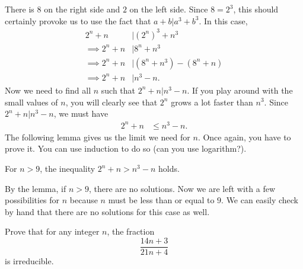 \documentclass{subfile}
\begin{document}
		\begin{solution}
			There is $8$ on the right side and $2$ on the left side. Since $8=2^3$, this should certainly provoke us to use the fact that $a+b|a^3+b^3$. In this case,
				\begin{align*}
					2^n+n   & |(2^n)^3+n^3 \\
					\implies  2^n+n & | 8^n+n^3\\
					\implies 2^n+n	& |(8^n+n^3)-(8^n+n)\\
					\implies 2^n+n & | n^3-n.
				\end{align*}
			Now we need to find all $n$ such that $2^n+n|n^3-n$. If you play around with the small values of $n$, you will clearly see that $2^n$ grows a lot faster than $n^3$. Since $2^n+n|n^3-n$, we must have
				\begin{align*}
					2^n+n & \leq n^3-n.
				\end{align*}
			The following lemma gives us the limit we need for $n$. Once again, you have to prove it. You can use induction to do so (can you use logarithm?).
				\begin{lemma}
					For $n>9$, the inequality $2^n+n>n^3-n$ holds.
				\end{lemma}
			By the lemma, if $n>9$, there are no solutions. Now we are left with a few possibilities for $n$ because $n$ must be less than or equal to $9$. We can easily check by hand that there are no solutions for this case as well.
		\end{solution}

		\begin{problem}
			Prove that for any integer $n$, the fraction $$\dfrac{14n+3}{21n+4}$$ is irreducible.
		\end{problem}
\end{document}
